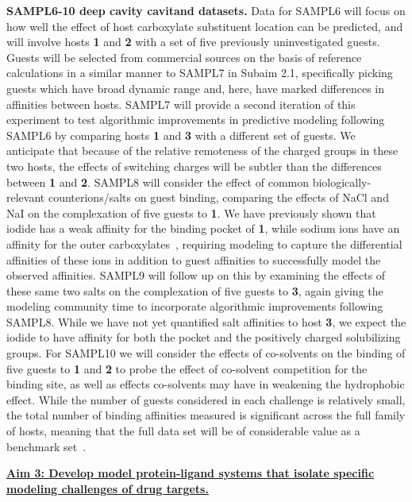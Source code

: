 \documentclass[11pt]{article}
\begin{document}
{\bf SAMPL6-10 deep cavity cavitand datasets.} 
Data for SAMPL6 will focus on how well the effect of host carboxylate substituent location can be predicted, and will involve hosts {\bf 1} and {\bf 2} with a set of five previously uninvestigated guests.  
Guests will be selected from commercial sources on the basis of reference calculations in a similar manner to SAMPL7 in Subaim 2.1, specifically picking guests which have broad dynamic range and, here, have marked differences in affinities between hosts.
SAMPL7 will provide a second iteration of this experiment to test algorithmic improvements in predictive modeling following SAMPL6 by comparing hosts {\bf 1} and {\bf 3} with a different set of guests.  
We anticipate that because of the relative remoteness of the charged groups in these two hosts, the effects of switching charges will be subtler than the differences between {\bf 1} and {\bf 2}.  
SAMPL8 will consider the effect of common biologically-relevant counterions/salts on guest binding, comparing the effects of NaCl and NaI on the complexation of five guests to {\bf 1}.  
We have previously shown that iodide has a weak affinity for the binding pocket of {\bf 1}, while sodium ions have an affinity for the outer carboxylates~\cite{carnegie_anion_2014}, requiring modeling to capture the differential affinities of these ions in addition to guest affinities to successfully model the observed affinities.  
SAMPL9 will follow up on this by examining the effects of these same two salts on the complexation of five guests to {\bf 3}, again giving the modeling community time to incorporate algorithmic improvements following SAMPL8. 
While we have not yet quantified salt affinities to host {\bf 3}, we expect the iodide to have affinity for both the pocket and the positively charged solubilizing groups.  
For SAMPL10 we will consider the effects of co-solvents on the binding of five guests to {\bf 1} and {\bf 2} to probe the effect of co-solvent competition for the binding site, as well as effects co-solvents may have in weakening the hydrophobic effect. 
While the number of guests considered in each challenge is relatively small, the total number of binding affinities measured is significant across the full family of hosts, meaning that the full data set will be of considerable value as a benchmark set~\cite{mobley_predicting_2016}. 


\textbf{\underline{Aim 3: Develop model protein-ligand systems that isolate specific modeling challenges of drug targets.}}
\end{document}
